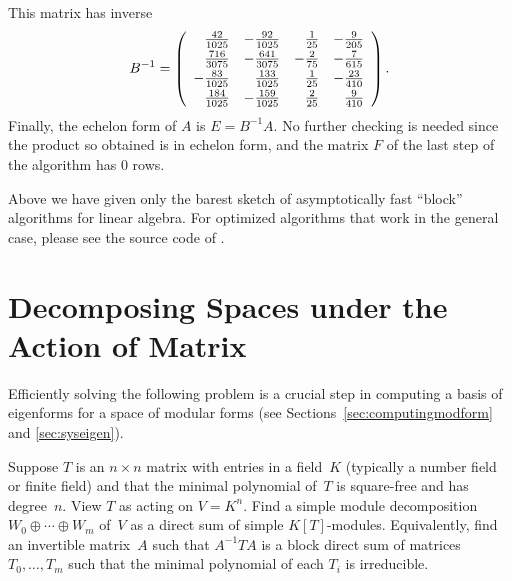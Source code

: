 \begin{example}
This matrix has inverse
$$
B^{-1} = 
\left(\begin{array}{rrrr}
\frac{42}{1025}&-\frac{92}{1025}&\frac{1}{25}&-\frac{9}{205}\vspace{2pt}\\
\frac{716}{3075}&-\frac{641}{3075}&-\frac{2}{75}&-\frac{7}{615}\vspace{2pt}\\
-\frac{83}{1025}&\frac{133}{1025}&\frac{1}{25}&-\frac{23}{410}\vspace{2pt}\\
\frac{184}{1025}&-\frac{159}{1025}&\frac{2}{25}&\frac{9}{410}
\end{array}\right).
$$
Finally, the echelon form of $A$ is 
$
 E = B^{-1}A.
$
No further checking is needed since the product so
obtained is in echelon form, and the matrix $F$
of the last step of the algorithm has $0$ rows.

\end{example}

\begin{remark}
Above we have given only the barest sketch of asymptotically fast
``block'' algorithms for linear algebra.  For optimized algorithms
that work in the general case, please see the source code of \cite{sage}.
\end{remark}


\section{Decomposing Spaces under the Action of Matrix}
\label{sec:decompmodsym}

Efficiently solving the following problem is a crucial step in
computing a basis of eigenforms for a space of modular forms 
(see Sections~\ref{sec:computingmodform} and \ref{sec:syseigen}).

\begin{problem}\label{prob:decomp}
  Suppose $T$ is an $n\times n$ matrix with entries in a field~$K$
  (typically a number field or finite field) and that the minimal
  polynomial of~$T$ is square-free and has degree~$n$.  View $T$ as
  acting on $V=K^n$.  Find a simple module decomposition $W_0 \oplus
  \cdots \oplus W_m$ of~$V$ as a direct sum of simple $K[T]$-modules.
  Equivalently, find an invertible matrix~$A$ such that $A^{-1} T A$
  is a block direct sum of matrices $T_0, \ldots, T_m$ such that the
  minimal polynomial of each $T_i$ is irreducible.
\end{problem}

